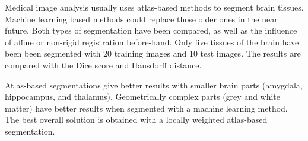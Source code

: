 Medical image analysis usually uses atlas-based methods to segment brain tissues. Machine learning based methods could replace those older ones in the near future. Both types of segmentation have been compared, as well as the influence of affine or non-rigid registration before-hand. Only five tissues of the brain have been been segmented with 20 training images and 10 test images. The results are compared with the Dice score and Hausdorff distance.

Atlas-based segmentations give better results with smaller brain parts (amygdala, hippocampus, and thalamus). Geometrically complex parts (grey and white matter) have better results when segmented with a machine learning method. The best overall solution is obtained with a locally weighted atlas-based segmentation.